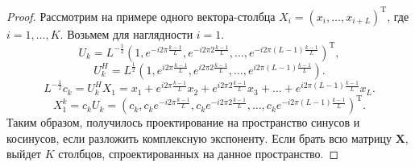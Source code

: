 \documentclass[a4paper, 11pt]{article}
\newtheorem{comment}{Замечание} %
\begin{document}

\begin{proof}
	Рассмотрим на примере одного вектора-столбца $X_i = \left(x_i, \dots, x_{i+L}\right)^{\mathrm T}$, где $i = 1, \dots, K$. Возьмем для наглядности $i = 1$.
	$$
	U_k = L^{-\frac{1}{2}}\left(1, e^{-i2\pi \frac{k-1}{L}}, e^{-i2\pi 2\frac{k-1}{L}}, \dots, e^{-i2\pi (L-1)\frac{k-1}{L}}\right)^{\mathrm T},
	$$
	$$
	U_k^H = L^{\frac{1}{2}}\left(1, e^{i2\pi \frac{k-1}{L}}, e^{i2\pi 2\frac{k-1}{L}}, \dots, e^{i2\pi (L-1)\frac{k-1}{L}}\right).
	$$
	$$
	L^{-\frac{1}{2}}c_k = U_k^H X_1 = x_1 + e^{i2\pi \frac{k-1}{L}} x_2 + e^{i2\pi 2\frac{k-1}{L}} x_3 + \dots + e^{i2\pi (L-1)\frac{k-1}{L}} x_L.
	$$
	$$
	X_1^k = c_k U_k = \left(c_k, c_k e^{-i2\pi \frac{k-1}{L}}, c_k e^{-i2\pi 2\frac{k-1}{L}}, \dots, c_k e^{-i2\pi (L-1)\frac{k-1}{L}}\right)^{\mathrm T}.
	$$
	Таким образом, получилось проектирование на пространство синусов и косинусов, если разложить комплексную экспоненту. 
	Если брать всю матрицу $\mathbf X$, выйдет $K$ столбцов, спроектированных на данное пространство.
\end{proof}

\end{document}
